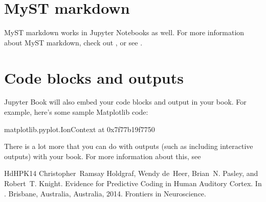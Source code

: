 \documentclass[letterpaper,10pt,english]{jupyterBook}
\begin{document}
\section{MyST markdown}
\label{\detokenize{notebooks:myst-markdown}}
\sphinxAtStartPar
MyST markdown works in Jupyter Notebooks as well. For more information about MyST markdown, check
out ,
or see .


\section{Code blocks and outputs}
\label{\detokenize{notebooks:code-blocks-and-outputs}}
\sphinxAtStartPar
Jupyter Book will also embed your code blocks and output in your book.
For example, here’s some sample Matplotlib code:

\begin{sphinxVerbatim}[commandchars=\\\{\}]
    
   
   
\end{sphinxVerbatim}

\begin{sphinxVerbatim}[commandchars=\\\{\}]
\PYGZlt{}matplotlib.pyplot.\PYGZus{}IonContext at 0x7f77b19f7750\PYGZgt{}
\end{sphinxVerbatim}

\noindent{}

\sphinxAtStartPar
There is a lot more that you can do with outputs (such as including interactive outputs)
with your book. For more information about this, see 

\begin{sphinxthebibliography}{HdHPK14}
\sphinxAtStartPar
Christopher Ramsay Holdgraf, Wendy de Heer, Brian N. Pasley, and Robert T. Knight. Evidence for Predictive Coding in Human Auditory Cortex. In . Brisbane, Australia, Australia, 2014. Frontiers in Neuroscience.
\end{sphinxthebibliography}







\renewcommand{\indexname}{Index}
\printindex
\end{document}

